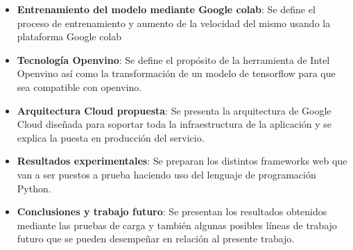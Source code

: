 \begin{itemize}
    \item \textbf{Entrenamiento del modelo mediante Google colab}: Se define el proceso de entrenamiento y aumento de la velocidad del mismo usando la plataforma Google colab
    \item \textbf{Tecnología Openvino}: Se define el propósito de la herramienta de Intel Openvino así como la transformación de un modelo de tensorflow para que sea compatible con openvino.
    \item \textbf{Arquitectura Cloud propuesta}: Se presenta la arquitectura de Google Cloud diseñada para soportar toda la infraestructura de la aplicación y se explica la puesta en producción del servicio.
    \item \textbf{Resultados experimentales}: Se preparan los distintos frameworks web que van a ser puestos a prueba haciendo uso del lenguaje de programación Python.
    \item \textbf{Conclusiones y trabajo futuro}: Se presentan los resultados obtenidos mediante las pruebas de carga y también algunas posibles líneas de trabajo futuro que se pueden desempeñar en relación al presente trabajo.
\end{itemize}